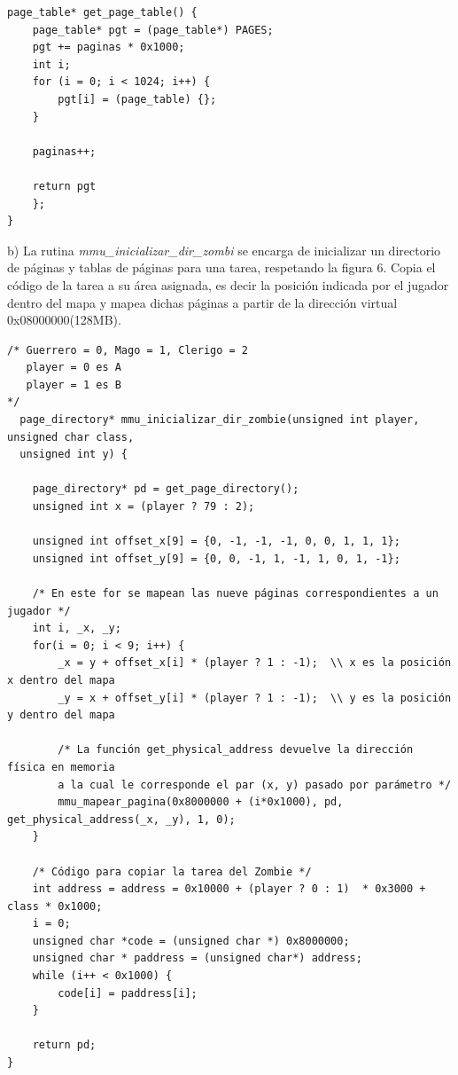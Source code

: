 \documentclass[a4paper]{article}
\begin{document}
\begin{codesnippet}
\begin{verbatim}
page_table* get_page_table() {
    page_table* pgt = (page_table*) PAGES;
    pgt += paginas * 0x1000;
    int i;
    for (i = 0; i < 1024; i++) {
        pgt[i] = (page_table) {};
    }

    paginas++;

    return pgt
    };
}
\end{verbatim}
\end{codesnippet}
{\large b)} La rutina \textit{mmu_inicializar_dir_zombi} se encarga de inicializar un directorio
de p\'aginas y tablas de p\'aginas para una tarea, respetando la figura 6. Copia
el c\'odigo de la tarea a su \'area asignada, es decir la posici\'on indicada por el jugador dentro
del mapa y mapea dichas p\'aginas a partir de la direcci\'on virtual 0x08000000(128MB).


\begin{codesnippet}
\begin{verbatim}
/* Guerrero = 0, Mago = 1, Clerigo = 2
   player = 0 es A
   player = 1 es B
*/
  page_directory* mmu_inicializar_dir_zombie(unsigned int player, unsigned char class, 
  unsigned int y) {

    page_directory* pd = get_page_directory();
    unsigned int x = (player ? 79 : 2);

    unsigned int offset_x[9] = {0, -1, -1, -1, 0, 0, 1, 1, 1};
    unsigned int offset_y[9] = {0, 0, -1, 1, -1, 1, 0, 1, -1};

    /* En este for se mapean las nueve páginas correspondientes a un jugador */
    int i, _x, _y;
    for(i = 0; i < 9; i++) {
        _x = y + offset_x[i] * (player ? 1 : -1);  \\ x es la posición x dentro del mapa
        _y = x + offset_y[i] * (player ? 1 : -1);  \\ y es la posición y dentro del mapa

        /* La función get_physical_address devuelve la dirección física en memoria
        a la cual le corresponde el par (x, y) pasado por parámetro */      
        mmu_mapear_pagina(0x8000000 + (i*0x1000), pd, get_physical_address(_x, _y), 1, 0);      
    }

    /* Código para copiar la tarea del Zombie */
    int address = address = 0x10000 + (player ? 0 : 1)  * 0x3000 + class * 0x1000;
    i = 0;
    unsigned char *code = (unsigned char *) 0x8000000;
    unsigned char * paddress = (unsigned char*) address;
    while (i++ < 0x1000) {
        code[i] = paddress[i];
    }
    
    return pd;
}
\end{verbatim}
\end{codesnippet}
\end{document}

